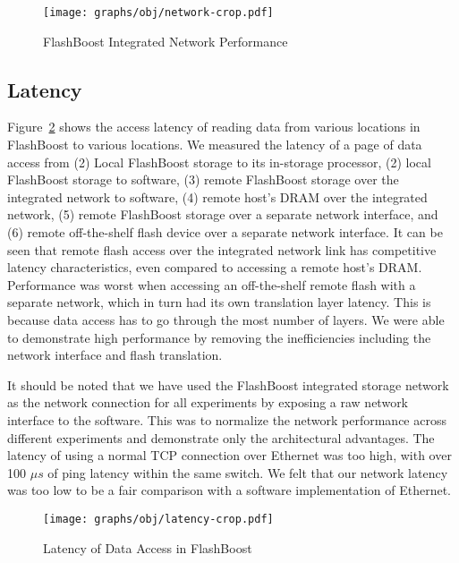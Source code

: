 \begin{figure}[h]
	\begin{center}
	\texttt{[image: graphs/obj/network-crop.pdf]}
	\caption{FlashBoost Integrated Network Performance}
	\label{fig:result_network}
	\end{center}
\end{figure}

\subsection{Latency}

Figure~\ref{fig:result_latency} shows the access latency of reading data from
various locations in FlashBoost to various locations. We measured the latency of
a page of data access from (2) Local FlashBoost storage to its in-storage
processor, (2) local FlashBoost storage to software, (3) remote FlashBoost
storage over the integrated network to software, (4) remote host's DRAM over the integrated
network, (5) remote FlashBoost storage over a separate network interface, and
(6) remote off-the-shelf flash device over a separate network interface. It
can be seen that remote flash access over the integrated network link has
competitive latency characteristics, even compared to accessing a remote host's
DRAM. Performance was worst when accessing an off-the-shelf remote flash with a separate
network, which in turn had its own translation layer latency. This is because
data access has to go through the most number of layers. We were able to
demonstrate high performance by removing the inefficiencies including the
network interface and flash translation.

It should be noted that we have used the FlashBoost integrated storage network
as the network connection for all experiments by exposing a raw network
interface to the software. This was to normalize the network performance across
different experiments and demonstrate only the architectural advantages. The
latency of using a normal TCP connection over Ethernet was too high, with over 100
$\mu s$ of ping latency within the same switch.  We felt that our network
latency was too low to be a fair comparison with a software implementation
of Ethernet.

\begin{figure}[h]
	\begin{center}
	\texttt{[image: graphs/obj/latency-crop.pdf]}
	\caption{Latency of Data Access in FlashBoost}
	\label{fig:result_latency}
	\end{center}
\end{figure}
%
%


